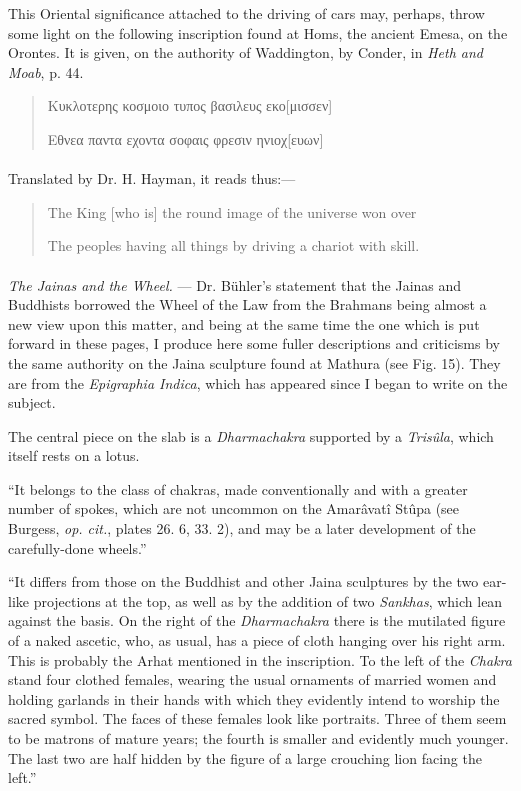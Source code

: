 \documentclass[a4paper, 11pt, oneside, polutonikogreek, english]{article}
\begin{document}
This Oriental significance attached to the driving of cars may, perhaps, throw some light on the following inscription found at Homs, the ancient Emesa, on the Orontes. It is given, on the authority of Waddington, by Conder, in \emph{Heth and Moab}, p. 44.

\begin{quotation}\small
Κυκλοτερης κοσμοιο τυπος βασιλευς εκο[μισσεν]

Εθνεα παντα εχοντα σοφαις φρεσιν ηνιοχ[ευων]
\end{quotation}
\paragraph{}
Translated by Dr. H. Hayman, it reads thus:---

\begin{quotation}\small
The King [who is] the round image of the universe won over

The peoples having all things by driving a chariot with skill.
\end{quotation}
\paragraph{}
\emph{The Jainas and the Wheel.} --- Dr. Bühler's statement that the Jainas and Buddhists borrowed the Wheel of the Law from the Brahmans being almost a new view upon this matter, and being at the same time the one which is put forward in these pages, I produce here some fuller descriptions and criticisms by the same authority on the Jaina sculpture found at Mathura (see Fig. 15). They are from the \emph{Epigraphia Indica}, which has appeared since I began to write on the subject.

The central piece on the slab is a \emph{Dharmachakra} supported by a \emph{Trisûla}, which itself rests on a lotus.

``It belongs to the class of chakras, made conventionally and with a greater number of spokes, which are not uncommon on the Amarâvatî Stûpa (see Burgess, \emph{op. cit.}, plates 26. 6, 33. 2), and may be a later development of the carefully-done wheels.''

``It differs from those on the Buddhist and other Jaina sculptures by the two ear-like projections at the top, as well as by the addition of two \emph{Sankhas}, which lean against the basis. On the right of the \emph{Dharmachakra} there is the mutilated figure of a naked ascetic, who, as usual, has a piece of cloth hanging over his right arm. This is probably the Arhat mentioned in the inscription. To the left of the \emph{Chakra} stand four clothed females, wearing the usual ornaments of married women and holding garlands in their hands with which they evidently intend to worship the sacred symbol. The faces of these females look like portraits. Three of them seem to be matrons of mature years; the fourth is smaller and evidently much younger. The last two are half hidden by the figure of a large crouching lion facing the left.''
\end{document}
